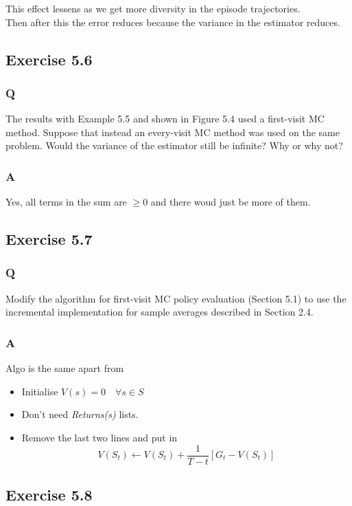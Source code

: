 This effect lessens as we get more diversity in the episode trajectories.\\

Then after this the error reduces because the variance in the estimator reduces.

\subsection{Exercise 5.6}
\subsubsection{Q}
The results with Example 5.5 and shown in Figure 5.4 used a first-visit MC method. Suppose that instead an every-visit MC method was used on the same problem. Would the variance of the estimator still be infinite? Why or why not?
\subsubsection{A}
Yes, all terms in the sum are $\geq 0$ and there woud just be more of them.

\subsection{Exercise 5.7}
\subsubsection{Q}
Modify the algorithm for first-visit MC policy evaluation (Section 5.1) to use the incremental implementation for sample averages described in Section 2.4.

\subsubsection{A}
Algo is the same apart from 
\begin{itemize}
    \item Initialise $V(s) = 0 \quad \forall s \in S$
    \item Don't need \emph{Returns(s)} lists.
    \item Remove the last two lines and put in \[ V(S_t) \leftarrow V(S_t) + \frac{1}{T- t}[ G_t - V(S_t) ] \]
\end{itemize}

\subsection{Exercise 5.8}
